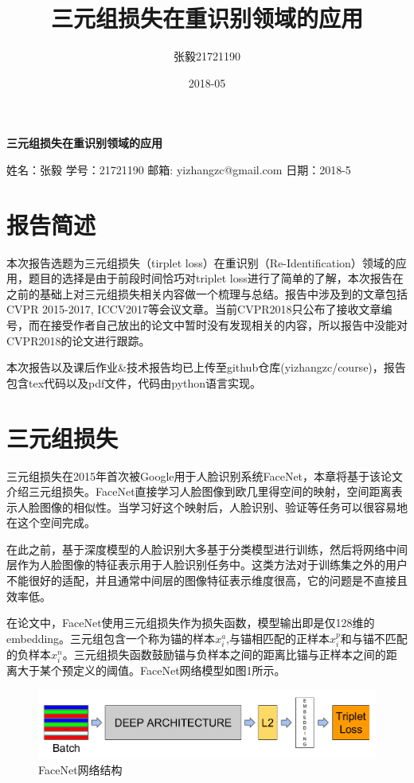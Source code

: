 \documentclass[a4paper]{article}
\title{三元组损失在重识别领域的应用}
\date{2018-05}
\author{张毅\hspace{1em}21721190}
\begin{document}
    
    \begin{center}
        \doublespacing
        
        \Large \textbf{三元组损失在重识别领域的应用}

        \normalsize 姓名：张毅 \qquad 学号：21721190 \qquad 邮箱: yizhangzc@gmail.com \qquad 日期：2018-5
    \end{center}
    

    \section{报告简述}

    本次报告选题为三元组损失（tirplet loss）在重识别（Re-Identification）领域的应用，题目的选择是由于前段时间恰巧对triplet loss进行了简单的了解，本次报告在之前的基础上对三元组损失相关内容做一个梳理与总结。报告中涉及到的文章包括CVPR 2015-2017, ICCV2017等会议文章。当前CVPR2018只公布了接收文章编号，而在接受作者自己放出的论文中暂时没有发现相关的内容，所以报告中没能对CVPR2018的论文进行跟踪。

    本次报告以及课后作业\&技术报告均已上传至github仓库(yizhangzc/course)，报告包含tex代码以及pdf文件，代码由python语言实现。

    \section{三元组损失}

    三元组损失在2015年首次被Google用于人脸识别系统FaceNet\cite{cvpr15facenet}，本章将基于该论文介绍三元组损失。FaceNet直接学习人脸图像到欧几里得空间的映射，空间距离表示人脸图像的相似性。当学习好这个映射后，人脸识别、验证等任务可以很容易地在这个空间完成。

    在此之前，基于深度模型的人脸识别大多基于分类模型进行训练，然后将网络中间层作为人脸图像的特征表示用于人脸识别任务中。这类方法对于训练集之外的用户不能很好的适配，并且通常中间层的图像特征表示维度很高，它的问题是不直接且效率低。

    在论文中，FaceNet使用三元组损失作为损失函数，模型输出即是仅128维的embedding。三元组包含一个称为锚的样本$x_i^a$,与锚相匹配的正样本$x_i^p$和与锚不匹配的负样本$x_i^n$。三元组损失函数鼓励锚与负样本之间的距离比锚与正样本之间的距离大于某个预定义的阈值。FaceNet网络模型如图1所示。

    \begin{figure}[H]
        \centering
        \includegraphics[width=0.9\linewidth]{./images/facenet_structure.png}
        \caption{FaceNet网络结构}
        \label{fig:facenet_structure}
    \end{figure}
    
\end{document}
